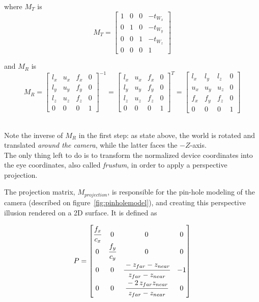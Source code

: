 where $M_T$ is
\begin{equation}
	M_T = \begin{bmatrix}
			1 & 0 & 0 & -t_W_x\\
			0 & 1 & 0 & -t_W_y\\
			0 & 0 & 1 & -t_W_z\\
			0 & 0 & 0 & 1
		\end{bmatrix}
\end{equation}

and $M_R$ is
\begin{equation}
	M_R = \begin{bmatrix}
			l_x & u_x & f_x & 0\\
			l_y & u_y & f_y & 0\\
			l_z & u_z & f_z & 0\\
			0 & 0 & 0 & 1
		\end{bmatrix}^{-1}
		= \begin{bmatrix}
			l_x & u_x & f_x & 0\\
			l_y & u_y & f_y & 0\\
			l_z & u_z & f_z & 0\\
			0 & 0 & 0 & 1
		\end{bmatrix}^{T}
		= \begin{bmatrix}
			l_x & l_y & l_z & 0\\
			u_x & u_y & u_z & 0\\
			f_x & f_y & f_z & 0\\
			0 & 0 & 0 & 1
		\end{bmatrix}
\end{equation}

~\\Note the inverse of $M_R$ in the first step: as state above, the world is
rotated and translated \emph{around the camera}, while the latter faces the
$-Z$-axis.\\

The only thing left to do is to transform the normalized device coordinates
into the eye coordinates, also called \emph{frustum}, in order to apply a
perspective projection.

The projection matrix, $M_{projection}$, is responsible for the pin-hole
modeling of the camera (described on figure~\ref{fig:pinholemodel}), and
creating this perspective illusion rendered on a 2D surface. It is defined as

\begin{equation} \label{equ:projection}
	P = \begin{bmatrix}
			\cfrac{f_x}{c_x} & 0 & 0 & 0 \\
			0 & \cfrac{f_y}{c_y} & 0 & 0 \\
			0 & 0 & \cfrac{-z_{far} -z_{near}}{z_{far} - z_{near}} & -1\\
			0 & 0 & \cfrac{-2 \, z_{far} z_{near}}{z_{far}-z_{near}} & 0
		\end{bmatrix}
\end{equation}

